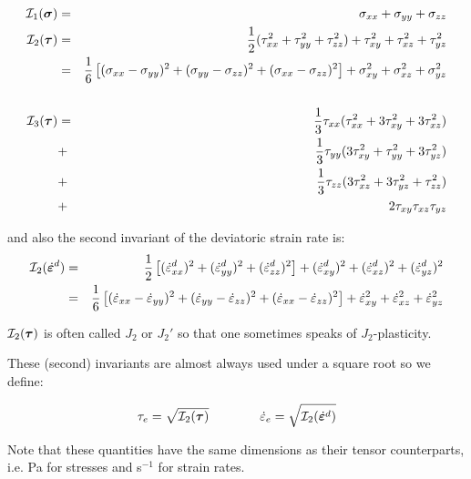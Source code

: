 \begin{eqnarray}
{\cal I}_1({\bm \sigma}) &=& \sigma_{xx}+\sigma_{yy}+\sigma_{zz}\\
{\cal I}_2({\bm \tau})   
&=&\frac{1}{2}(\tau_{xx}^2 + \tau_{yy}^2 + \tau_{zz}^2 ) + \tau_{xy}^2 + \tau_{xz}^2 + \tau_{yz}^2  \\
&=&\frac{1}{6}\left[(\sigma_{xx}-\sigma_{yy})^2 + (\sigma_{yy}-\sigma_{zz})^2 + (\sigma_{xx}-\sigma_{zz})^2 \right]  + \sigma_{xy}^2 + \sigma_{xz}^2 + \sigma_{yz}^2  \\
\nonumber\\
{\cal I}_3({\bm \tau}) 
&=& \frac{1}{3} \tau_{xx} (  \tau_{xx}^2 + 3 \tau_{xy}^2 + 3 \tau_{xz}^2  )     \nonumber\\
&+& \frac{1}{3} \tau_{yy} (3 \tau_{xy}^2 +   \tau_{yy}^2 + 3 \tau_{yz}^2  )     \nonumber\\
&+& \frac{1}{3} \tau_{zz} (3 \tau_{xz}^2 + 3 \tau_{yz}^2 +   \tau_{zz}^2)       \nonumber\\
&+& 2 \tau_{xy} \tau_{xz} \tau_{yz}  
\end{eqnarray}

and also the second invariant of the deviatoric strain rate is:
\begin{eqnarray}
{\cal I}_2(\dot{\bm{\varepsilon}}^d)
&=& \frac{1}{2} \left[ (\dot{\varepsilon}_{xx}^d)^2 + (\dot{\varepsilon}_{yy}^d)^2 + (\dot{\varepsilon}_{zz}^d)^2   \right] 
+ (\dot{\varepsilon}_{xy}^d)^2  
+ (\dot{\varepsilon}_{xz}^d)^2  
+ (\dot{\varepsilon}_{yz}^d)^2  \nonumber\\
&=& \frac{1}{6} \left[ (\dot{\varepsilon}_{xx}-\dot{\varepsilon}_{yy})^2 
+ (\dot{\varepsilon}_{yy}-\dot{\varepsilon}_{zz})^2 
+ (\dot{\varepsilon}_{xx}-\dot{\varepsilon}_{zz})^2 \right] 
+ \dot{\varepsilon}_{xy}^2 + \dot{\varepsilon}_{xz}^2 + \dot{\varepsilon}_{yz}^2  \\
\end{eqnarray}

\begin{remark}
${\cal I}_2({\bm \tau})$ is often called $J_2$ or $J_2'$ so that one sometimes speaks of $J_2$-plasticity.
\end{remark}

These (second) invariants are almost always used under a square root so we define:
\begin{mdframed}[backgroundcolor=blue!5]
\begin{equation}
\tau_{e}=\sqrt{{\cal I}_2({\bm \tau})}
\quad\quad
\quad\quad
\dot{\varepsilon}_{e}=\sqrt{{\cal I}_2(\dot{\bm \varepsilon}^d)}
\label{eq:tauepse}
\end{equation}
\end{mdframed}
Note that these quantities have the same dimensions as their tensor counterparts, i.e. Pa for stresses and s$^{-1}$ for strain rates.

